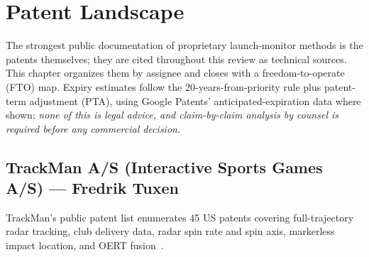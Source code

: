 \chapter{Patent Landscape}
\label{ch:patents}

The strongest public documentation of proprietary launch-monitor methods
is the patents themselves; they are cited throughout this review as
technical sources. This chapter organizes them by assignee and closes
with a freedom-to-operate (FTO) map. Expiry estimates follow the
20-years-from-priority rule plus patent-term adjustment (PTA), using
Google Patents' anticipated-expiration data where shown; \emph{none of
this is legal advice, and claim-by-claim analysis by counsel is required
before any commercial decision.}

\section{TrackMan A/S (Interactive Sports Games A/S) --- Fredrik Tuxen}
\label{sec:patenttrackman}

TrackMan's public patent list enumerates 45 US patents covering
full-trajectory radar tracking, club delivery data, radar spin rate and
spin axis, markerless impact location, and OERT
fusion~\cite{trackmanpatents}.


